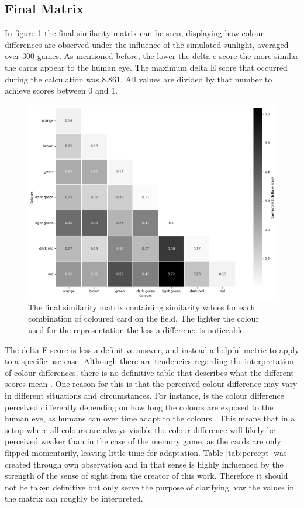 \subsection{Final Matrix}
\label{final_matrix}
In figure \ref{fig:simMatrix} the final similarity matrix can be seen, displaying how colour differences are observed under the influence of the simulated sunlight, averaged over 300 games. As mentioned before, the lower the delta e score the more similar the cards appear to the human eye. The maximum delta E score that occurred during the calculation was 8.861. All values are divided by that number to achieve scores between 0 and 1.
\begin{figure}[H]
	\centering
	\includegraphics[width=15cm]{images/simMatrixGrey.png}
	\caption[Bild kurz]{The final similarity matrix containing similarity values for each combination of coloured card on the field. The lighter the colour used for the representation the less a difference is noticeable}
	\label{fig:simMatrix}
\end{figure}
The delta E score is less a definitive answer, and instead a helpful metric to apply to a specific use case. Although there are tendencies regarding the interpretation of colour differences, there is no definitive table that describes what the different scores mean . One reason for this is that the perceived colour difference may vary in different situations and circumstances. For instance, is the colour difference perceived differently depending on how long the colours are exposed to the human eye, as humans can over time adapt to the colours . This means that in a setup where all colours are always visible the colour difference will likely be perceived weaker than in the case of the memory game, as the cards are only flipped momentarily, leaving little time for adaptation. Table \ref{tab:percept} was created through own observation and in that sense is highly influenced by the strength of the sense of sight from the creator of this work. Therefore it should not be taken definitive but only serve the purpose of clarifying how the values in the matrix can roughly be interpreted.

